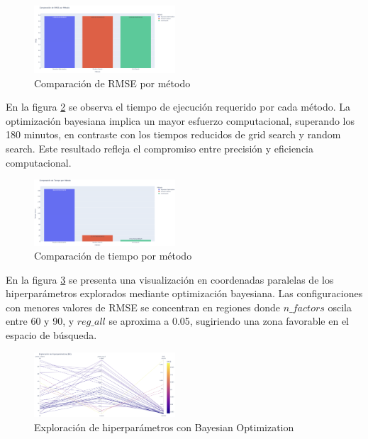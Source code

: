 \documentclass[twocolumn,10pt]{article}
\begin{document}
\begin{figure}[H]
\centering
\includegraphics[width=0.47\textwidth]{fig_comparacion_rmse.png}
\caption{Comparación de RMSE por método}
\label{fig:comparacion_rmse}
\end{figure}

En la figura \ref{fig:comparacion_tiempo} se observa el tiempo de ejecución requerido por cada método. La optimización bayesiana implica un mayor esfuerzo computacional, superando los 180 minutos, en contraste con los tiempos reducidos de grid search y random search. Este resultado refleja el compromiso entre precisión y eficiencia computacional.

\begin{figure}[H]
\centering
\includegraphics[width=0.47\textwidth]{fig_comparacion_tiempo.png}
\caption{Comparación de tiempo por método}
\label{fig:comparacion_tiempo}
\end{figure}

En la figura \ref{fig:hiperparametros} se presenta una visualización en coordenadas paralelas de los hiperparámetros explorados mediante optimización bayesiana. Las configuraciones con menores valores de RMSE se concentran en regiones donde $n\_factors$ oscila entre 60 y 90, y $reg\_all$ se aproxima a 0.05, sugiriendo una zona favorable en el espacio de búsqueda.

\begin{figure}[H]
\centering
\includegraphics[width=0.47\textwidth]{fig_hiperparametros.png}
\caption{Exploración de hiperparámetros con Bayesian Optimization}
\label{fig:hiperparametros}
\end{figure}
\end{document}
